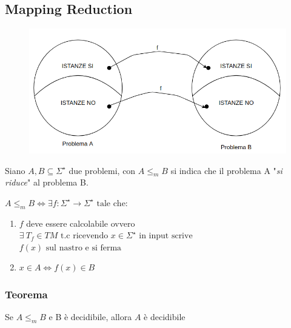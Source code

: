\subsection{Mapping Reduction}
\begin{figure}[H]
	\centering\includegraphics[scale=0.4]{riduzione}
\end{figure}
Siano $A,B \subseteq \Sigma^{\star}$ due problemi, con $A \le_{m} B$ si indica che il problema A "\textit{si riduce}" al problema B.
\begin{center}
	$A \le_{m} B \iff \exists f: \Sigma^{\star} \rightarrow \Sigma^{\star} \text{ tale che:}$
	\begin{enumerate}
		\item $f$ deve essere calcolabile ovvero $ \exists \ T_{f} \in TM \text{ t.c ricevendo } x \in \Sigma^{\star} \text{ in input scrive } $\\
$ f(x) \text{ sul nastro e si ferma}$ \\
		\item $x \in A \Leftrightarrow f(x) \in B$
	\end{enumerate}
\end{center}

\subsubsection{Teorema}

Se $A \le_{m} B$ e B è decidibile, allora $A$ è decidibile

